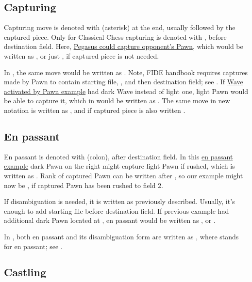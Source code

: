 \subsection*{Capturing}
\label{sec:Appendix/Capturing}

Capturing move is denoted with \alg{*} (asterisk) at the end, usually followed by the captured
piece. Only for Classical Chess capturing is denoted with , before destination field.
Here, \hyperref[fig:scn_ct_04_pegasus_movement]{Pegasus could capture opponent's Pawn}, which
would be written as , or just , if captured piece is not needed.

In , the same move would be written as . Note, FIDE handbook requires
captures made by Pawn to contain starting file, , and then destination field; see
.
If \hyperref[fig:scn_mv_22_wave_activation_by_capture_pawn]{Wave activated by Pawn example} had
dark Wave instead of light one, light Pawn would be able to capture it, which in 
would be written as . The same move in new notation is written as , and
if captured piece is also written .

\subsection*{En passant}
\label{sec:Appendix/En passant}

En passant is denoted with \alg{:} (colon), after destination field. In this
\hyperref[fig:04_croatian_ties_en_passant]{en passant example} dark Pawn on the right might capture
light Pawn if rushed, which is written as . Rank of captured Pawn can be written after
\alg{:}, so our example might now be , if captured Pawn has been rushed to field 2.

If disambiguation is needed, it is written as previously described. Usually, it's enough to add
starting file before destination field. If previous example had additional dark Pawn located at
, en passant would be written as , or .

In , both en passant and its disambiguation form are written as , where
 stands for en passant; see .

\subsection*{Castling}
\label{sec:Appendix/Castlingn}

